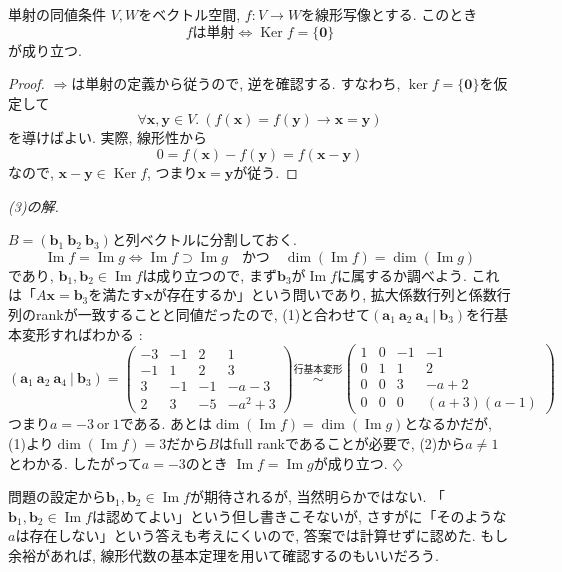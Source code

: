 \documentclass[titlepage]{jsarticle}
\numberwithin{equation}{section}
\newcommand{\Ker}{\operatorname{Ker}}
\renewcommand{\Im}{\operatorname{Im}}
\newenvironment{kaitou}[1][解]{%
\begin{proofbox}%
\textit{#1. }\ignorespaces
}{%
\hfill$\diamondsuit$%
\end{proofbox}%
}
\begin{document}
\begin{thm}{単射の同値条件}{}
$V, W$をベクトル空間, $f : V \to W$を線形写像とする. このとき
\[
f\text{は単射} \iff \Ker f = \{\bm{0}\}
\]
が成り立つ.
\end{thm}
\begin{proof}
$\Rightarrow$は単射の定義から従うので, 逆を確認する. すなわち, $\ker f = \{\bm{0}\}$を仮定して
\[
\forall \bm{x}, \bm{y} \in V. \:\left(f(\bm{x}) = f(\bm{y}) \to \bm{x} = \bm{y}\right)
\]
を導けばよい. 実際, 線形性から
\[
 0 = f(\bm{x}) - f(\bm{y}) = f(\bm{x} - \bm{y})
\]
なので, $\bm{x} - \bm{y} \in \Ker f$, つまり$\bm{x} = \bm{y}$が従う.
\end{proof}
\begin{kaitou}[(3)の解]
$B = \left(\bm{b}_1\:\bm{b}_2\:\bm{b}_3\right)$と列ベクトルに分割しておく.
\[
\Im f  = \Im g \iff \Im f \supset \Im g \quad \text{かつ} \quad \dim\left(\Im f\right) = \dim\left(\Im g\right)
\]
であり, $\bm{b}_1, \bm{b}_2 \in \Im f$は成り立つので, まず$\bm{b}_3$が$\Im f$に属するか調べよう. これは「$A\bm{x} = \bm{b}_3$を満たす$\bm{x}$が存在するか」という問いであり, 拡大係数行列と係数行列のrankが一致することと同値だったので, (1)と合わせて$\left(\bm{a}_1\:\bm{a}_2\:\bm{a}_4\:|\:\bm{b}_3\right)$を行基本変形すればわかる :
\[
\left(\bm{a}_1\:\bm{a}_2\:\bm{a}_4\:|\:\bm{b}_3\right) =
\left(
\begin{array}{ccc|c}
-3 & -1 & 2 & 1\\
-1 & 1 & 2 & 3\\
3 & -1 & -1 & -a-3\\
2 & 3 & -5 & -a^2+3
\end{array}
\right)
\overset{\text{行基本変形}}{\sim}
\left(
\begin{array}{ccc|c}
1 & 0 & -1  & -1 \\
0 & 1 & 1 & 2 \\
0 & 0& 3 & -a + 2 \\
0 & 0& 0& (a+3)(a-1)
\end{array}
\right)
\]
つまり$a = -3\:\text{or}\:1$である. あとは$\dim(\Im f) = \dim(\Im g)$となるかだが, (1)より$\dim(\Im f) = 3$だから$B$はfull rankであることが必要で, (2)から$a \ne 1$とわかる. したがって$\boxed{a = -3}$のとき $\Im f = \Im g$が成り立つ.
\end{kaitou}
\begin{marker}
問題の設定から$\bm{b}_1, \bm{b}_2 \in \Im f$が期待されるが, 当然明らかではない. 「$\bm{b}_1, \bm{b}_2\in\Im f$は認めてよい」という但し書きこそないが, さすがに「そのような$a$は存在しない」という答えも考えにくいので, 答案では計算せずに認めた. もし余裕があれば, 線形代数の基本定理を用いて確認するのもいいだろう.
\end{marker}
\end{document}
